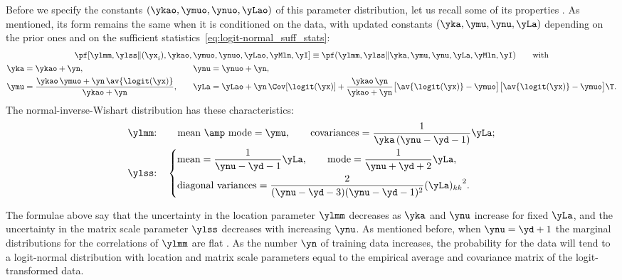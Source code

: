 Before we specify the constants $(\ykao,\ymuo,\ynuo,\yLao)$ of this
parameter distribution, let us recall some of its properties
\citetext{\citealp[\sect~3.6]{gelmanetal1995_r2014};
  \citealp{minka1998_r2001,murphy2007}}. As mentioned, its form remains the
same when it is conditioned on the data, with updated constants
$(\yka,\ymu,\ynu,\yLa)$ depending on the prior ones and on the sufficient
statistics~\eqref{eq:logit-normal_suff_stats}:
\begin{multline}\label{eq:update_consts_logit-norm}
  \pf[\ylmm, \ylss \|(\yx_i),\ykao,\ymuo,\ynuo,\yLao,\yMln, \yI] \equiv
  \pf(\ylmm, \ylss \|\yka,\ymu,\ynu,\yLa,\yMln, \yI)
  \qquad\text{with}\\
  \begin{aligned}
    \yka &= \ykao + \yn,\quad     &\ynu &= \ynuo + \yn,\\
    \ymu &= \frac{\ykao\,\ymuo+\yn\, \av{\logit(\yx)}}{\ykao+\yn},\quad
    &\yLa &= \yLao + \yn\, \Cov[\logit(\yx)]
           + \frac{\ykao\,\yn}{\ykao+\yn} \bigl[\av{\logit(\yx)}-\ymuo\bigr] \bigl[\av{\logit(\yx)}-\ymuo\bigr]\T.
  \end{aligned}
\end{multline}
The normal-inverse-Wishart distribution has these characteristics:
\begin{equation}
  \label{eq:moments_modes_norm-iwishart}
  \begin{aligned}
    &\text{$\ylmm$:}\quad\;\hphantom{\Biggl\{}\text{mean \amp\ mode} = \ymu,
      \qquad\text{covariances} = \frac{1}{\yka\,(\ynu-\yd-1)}\yLa;\\
    &\text{$\ylss$:}\quad\left\{ 
      \!\begin{aligned}
          &\text{mean} = \frac{1}{\ynu-\yd-1}\yLa,
            \qquad\text{mode} = \frac{1}{\ynu+\yd+2}\yLa,\\
          &\text{diagonal variances} =
            \frac{2}{(\ynu-\yd-3)(\ynu-\yd-1)^2}{(\yLa)_{kk}}^2.
      \end{aligned}\right.
  \end{aligned}
\end{equation}

The formulae above say that the uncertainty in the location parameter
$\ylmm$ decreases as $\yka$ and $\ynu$ increase for fixed $\yLa$, and the
uncertainty in the matrix scale parameter $\ylss$ decreases with increasing
$\ynu$. As mentioned before, when $\ynu=\yd+1$ the marginal distributions
for the correlations of $\ylmm$ are flat
\citetext{\citealp[\sect~3.6]{gelmanetal1995_r2014};
  \citealp[\sect~2.2]{barnardetal2000}}. As the number $\yn$ of training
data increases, the probability for the data will tend to a logit-normal
distribution with location and matrix scale parameters equal to the
empirical average and covariance matrix of the logit-transformed data.

